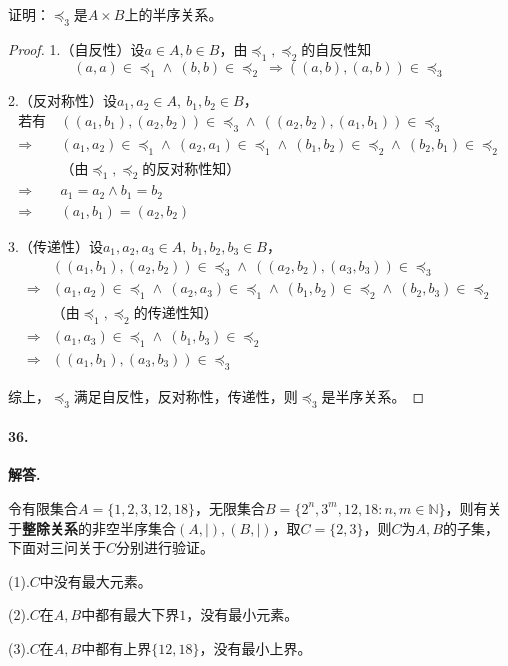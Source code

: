 \documentclass[12pt, a4paper, oneside]{ctexart}
\newenvironment{solution}{\par\noindent\textbf{解答. }}{\bigskip\par}
\begin{document}
证明：$\preccurlyeq_3$是$A\times B$上的半序关系。
\begin{proof}

    1.（自反性）设$a\in A,b\in B$，由$\preccurlyeq_1,\preccurlyeq_2$的自反性知
    \begin{equation*}
        (a,a)\in\preccurlyeq_1\wedge\ (b,b)\in\preccurlyeq_2\ \Rightarrow ((a, b), (a, b))\in\preccurlyeq_3
    \end{equation*}

    2.（反对称性）设$a_1,a_2\in A,\ b_1, b_2\in B$，
    \begin{equation*}
        \begin{aligned}
            \text{若有}\ &((a_1,b_1),(a_2,b_2))\in\preccurlyeq_3\wedge\ ((a_2,b_2),(a_1,b_1))\in\preccurlyeq_3\\
            \Rightarrow&(a_1,a_2)\in\preccurlyeq_1\wedge\ (a_2,a_1)\in\preccurlyeq_1\wedge\ (b_1,b_2)\in\preccurlyeq_2\wedge\ (b_2,b_1)\in\preccurlyeq_2\\
            &\text{（由}\preccurlyeq_1,\preccurlyeq_2\text{的反对称性知）}\\
            \Rightarrow&a_1=a_2\wedge b_1=b_2\\
            \Rightarrow&(a_1,b_1)=(a_2,b_2)
        \end{aligned}
    \end{equation*}

    3.（传递性）设$a_1,a_2,a_3\in A,\ b_1,b_2,b_3\in B$，
    \begin{equation*}
        \begin{aligned}
            &((a_1,b_1),(a_2,b_2))\in\preccurlyeq_3\wedge\ ((a_2,b_2), (a_3,b_3))\in\preccurlyeq_3\\
            \Rightarrow&(a_1,a_2)\in\preccurlyeq_1\wedge\ (a_2,a_3)\in\preccurlyeq_1\wedge\ (b_1,b_2)\in\preccurlyeq_2\wedge\ (b_2,b_3)\in\preccurlyeq_2\\
            &\text{（由}\preccurlyeq_1,\preccurlyeq_2\text{的传递性知）}\\
            \Rightarrow&(a_1,a_3)\in\preccurlyeq_1\wedge\ (b_1,b_3)\in\preccurlyeq_2\\
            \Rightarrow&((a_1,b_1), (a_3, b_3))\in \preccurlyeq_3
        \end{aligned}
    \end{equation*}

    综上，$\preccurlyeq_3$满足自反性，反对称性，传递性，则$\preccurlyeq_3$是半序关系。
\end{proof}
\paragraph{36.}
\begin{solution}

令有限集合$A=\{1,2,3,12,18\}$，无限集合$B=\{2^n,3^m,12,18:n,m\in\mathbb{N}\}$，则有关于\textbf{整除关系}的非空半序集合$(A,|),(B,|)$，取$C=\{2,3\}$，则$C$为$A,B$的子集，下面对三问关于$C$分别进行验证。

(1).$C$中没有最大元素。

(2).$C$在$A,B$中都有最大下界$1$，没有最小元素。

(3).$C$在$A,B$中都有上界$\{12,18\}$，没有最小上界。
\end{solution}
\end{document}
